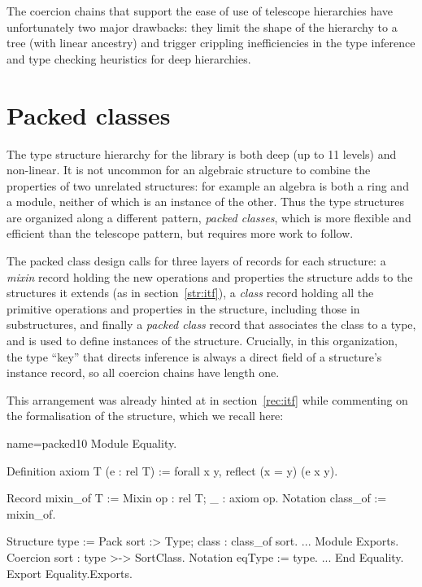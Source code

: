 The coercion chains that support the ease of use of telescope
hierarchies have unfortunately two major drawbacks: they limit the
shape of the hierarchy to a tree (with linear ancestry) and
trigger crippling inefficiencies in the type inference and type
checking heuristics for deep hierarchies.

\section{Packed classes}\label{sec:packed}

\warntechnical{}

The type structure hierarchy for the \mcbMC{} library is both deep
(up to 11 levels) and non-linear. It is not uncommon for an algebraic
structure to combine the properties of two unrelated structures: for
example an algebra is both a ring and a module, neither of which is an
instance of the other. Thus the \mcbMC{} type structures are organized
along a different pattern, \emph{packed classes}, which is more flexible
and efficient than the telescope pattern, but requires more work to follow.

The packed class design calls for three layers of records for each
structure: a \emph{mixin} record holding the new operations and
properties the structure adds to the structures it extends (as in
section~\ref{str:itf}), a \emph{class} record holding all the
primitive operations and properties in the structure,
including those in substructures,
and finally a \emph{packed class} record that associates the class to
a type, and is used to define instances of the structure. Crucially,
in this organization, the type ``key'' that directs inference is always
a direct field of a structure's instance record, so all coercion
chains have length one.

This arrangement was already hinted at in section~\ref{rec:itf} while
commenting on the formalisation of the  structure,
which we recall here:

\begin{coq}{name=packed10}{}
Module Equality.

Definition axiom T (e : rel T) := forall x y, reflect (x = y) (e x y).

Record mixin_of T := Mixin {op : rel T; _ : axiom op}.
Notation class_of := mixin_of.

Structure type := Pack {sort :> Type; class : class_of sort}.
...
Module Exports.
Coercion sort : type >-> SortClass.
Notation eqType := type.
...
End Equality.
Export Equality.Exports.
\end{coq}

